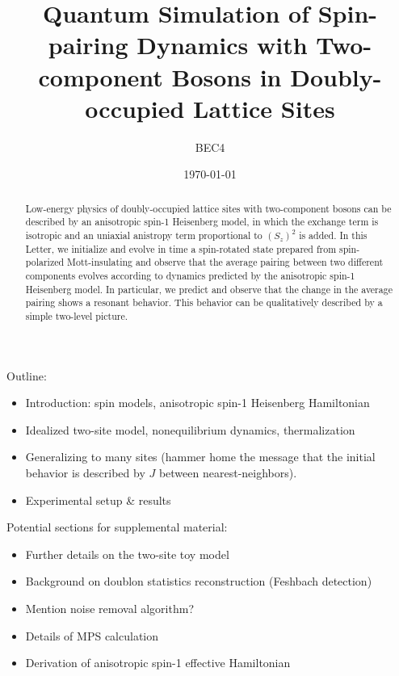 \documentclass[aps,prl,twocolumn,superscriptaddress]{revtex4-1}
\begin{document}
\title{Quantum Simulation of Spin-pairing Dynamics with Two-component Bosons in Doubly-occupied Lattice Sites}
            
\author{BEC4}

\date{\today}

\begin{abstract}
Low-energy physics of doubly-occupied lattice sites with two-component bosons can be described by an anisotropic spin-1 Heisenberg model, in which the exchange term is isotropic and an uniaxial anistropy term proportional to $(S_z)^2$ is added. In this Letter, we initialize and evolve in time a spin-rotated state prepared from spin-polarized Mott-insulating and observe that the average pairing between two different components evolves according to dynamics predicted by the anisotropic spin-1 Heisenberg model. In particular, we predict and observe that the change in the average pairing shows a resonant behavior. This behavior can be qualitatively described by a simple two-level picture. 
\end{abstract}

\maketitle

Outline:
\begin{itemize}
    \item Introduction: spin models, anisotropic spin-1 Heisenberg Hamiltonian
    \item Idealized two-site model, nonequilibrium dynamics, thermalization
    \item Generalizing to many sites (hammer home the message that the initial behavior is described by $J$ between nearest-neighbors).
    \item Experimental setup \& results
\end{itemize}

Potential sections for supplemental material:
\begin{itemize}
    \item Further details on the two-site toy model
    \item Background on doublon statistics reconstruction (Feshbach detection)
    \item Mention noise removal algorithm?
    \item Details of MPS calculation
    \item Derivation of anisotropic spin-1 effective Hamiltonian
\end{itemize}
\end{document}
